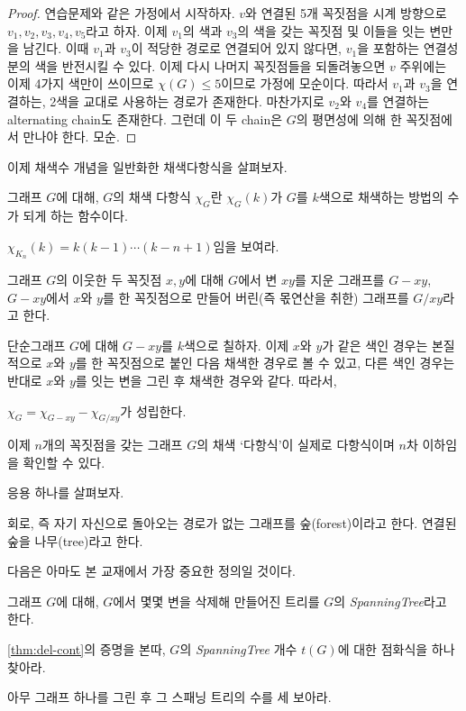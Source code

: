 \begin{proof}
    연습문제와 같은 가정에서 시작하자. $v$와 연결된 5개 꼭짓점을 시계 방향으로 $v_1, v_2, v_3, v_4, v_5$라고 하자. 이제 $v_1$의 색과 $v_3$의 색을 갖는 꼭짓점 및 이들을 잇는 변만을 남긴다. 이때 $v_1$과 $v_3$이 적당한 경로로 연결되어 있지 않다면, $v_1$을 포함하는 연결성분의 색을 반전시킬 수 있다. 이제 다시 나머지 꼭짓점들을 되돌려놓으면 $v$ 주위에는 이제 4가지 색만이 쓰이므로 $\chi(G)\leq 5$이므로 가정에 모순이다. 따라서 $v_1$과 $v_3$을 연결하는, 2색을 교대로 사용하는 경로가 존재한다. 마찬가지로 $v_2$와 $v_4$를 연결하는 alternating chain도 존재한다. 그런데 이 두 chain은 $G$의 평면성에 의해 한 꼭짓점에서 만나야 한다. 모순.
\end{proof}
이제 채색수 개념을 일반화한 채색다항식을 살펴보자. 
\begin{definition}\label{def:chrpoly}
    그래프 $G$에 대해, $G$의 채색 다항식 $\chi_G$란 $\chi_G(k)$가 $G$를 $k$색으로 채색하는 방법의 수가 되게 하는 함수이다. 
\end{definition}
\begin{exercise}
    $\chi_{K_n}(k)=k(k-1)\cdots (k-n+1)$임을 보여라.
\end{exercise}
\begin{definition}
    그래프 $G$의 이웃한 두 꼭짓점 $x, y$에 대해 $G$에서 변 $xy$를 지운 그래프를 $G-xy$, $G-xy$에서 $x$와 $y$를 한 꼭짓점으로 만들어 버린(즉 몫연산을 취한) 그래프를 $G/xy$라고 한다. 
\end{definition}
단순그래프 $G$에 대해 $G-xy$를 $k$색으로 칠하자. 이제 $x$와 $y$가 같은 색인 경우는 본질적으로 $x$와 $y$를 한 꼭짓점으로 붙인 다음 채색한 경우로 볼 수 있고, 다른 색인 경우는 반대로 $x$와 $y$를 잇는 변을 그린 후 채색한 경우와 같다. 따라서, 
\begin{theorem}\label{thm:del-cont}
    $\chi_G=\chi_{G-xy}-\chi_{G/xy}$가 성립한다. 
\end{theorem}
\begin{remark}
    이제 $n$개의 꼭짓점을 갖는 그래프 $G$의 채색 `다항식'이 실제로 다항식이며 $n$차 이하임을 확인할 수 있다. 
\end{remark}
응용 하나를 살펴보자. 
\begin{definition}
    회로, 즉 자기 자신으로 돌아오는 경로가 없는 그래프를 숲(forest)이라고 한다. 연결된 숲을 나무(tree)라고 한다.
\end{definition}
다음은 아마도 본 교재에서 가장 중요한 정의일 것이다. 
\begin{definition}
    그래프 $G$에 대해, $G$에서 몇몇 변을 삭제해 만들어진 트리를 $G$의 \textit{SpanningTree}라고 한다. 
\end{definition}
\begin{exercise}
    \cref{thm:del-cont}의 증명을 본따, $G$의 \textit{SpanningTree} 개수 $t(G)$에 대한 점화식을 하나 찾아라. 
\end{exercise}
\begin{exercise}
    아무 그래프 하나를 그린 후 그 스패닝 트리의 수를 세 보아라.
\end{exercise}
